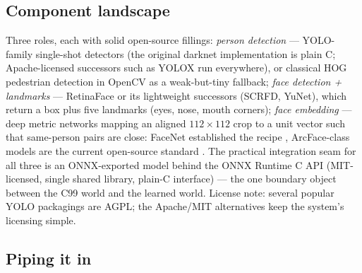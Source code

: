 \documentclass[11pt]{article}
\theoremstyle{definition}
\begin{document}
\subsection{Component landscape}
\label{sec:osscomponents}

Three roles, each with solid open-source fillings:
\emph{person detection} --- YOLO-family single-shot detectors
\cite{Redmon2018} (the original darknet implementation is plain C;
Apache-licensed successors such as YOLOX run everywhere), or classical
HOG pedestrian detection in OpenCV as a weak-but-tiny fallback;
\emph{face detection + landmarks} --- RetinaFace \cite{Deng2020} or its
lightweight successors (SCRFD, YuNet), which return a box plus five
landmarks (eyes, nose, mouth corners); \emph{face embedding} ---
deep metric networks mapping an aligned $112\times112$ crop to a unit
vector such that same-person pairs are close: FaceNet established the
recipe \cite{Schroff2015}, ArcFace-class models are the current
open-source standard \cite{Deng2019}. The practical integration seam for
all three is an ONNX-exported model behind the ONNX Runtime C API
(MIT-licensed, single shared library, plain-C interface) --- the one
boundary object between the C99 world and the learned world. License
note: several popular YOLO packagings are AGPL; the Apache/MIT
alternatives keep the system's licensing simple.

\subsection{Piping it in}
\label{sec:sidecar}
\end{document}
